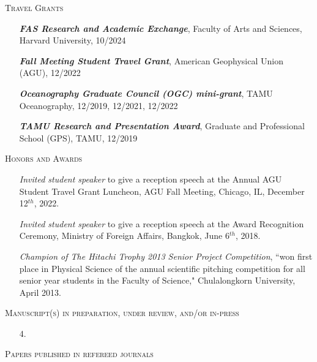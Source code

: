 \documentclass[10pt, letter]{article}
\newcommand{\margintext}[1]{\marginnote{\normalsize\textbf #1 |}}
\begin{document}
\textsc{Travel Grants}
\begin{itemize}[leftmargin=*]
    \item[] \emph{\textbf{FAS Research and Academic Exchange}}, Faculty of Arts and Sciences, Harvard University, 10/2024
    \item[] \emph{\textbf{Fall Meeting Student Travel Grant}}, American Geophysical Union (AGU), 12/2022
    \item[] \emph{\textbf{Oceanography Graduate Council (OGC) mini-grant}}, TAMU Oceanography, 12/2019, 12/2021, 12/2022 
    \item[] \emph{\textbf{TAMU Research and Presentation Award}}, Graduate and Professional School (GPS), TAMU, 12/2019
\end{itemize} 
\bigskip
\textsc{Honors and Awards}
\begin{itemize}[leftmargin=*]
    \item[] \emph{Invited student speaker} to give a reception speech at the Annual AGU Student Travel Grant Luncheon, AGU Fall Meeting, Chicago, IL, December 12$^{th}$, 2022.
    \item[] \emph{Invited student speaker} to give a reception speech at the Award Recognition Ceremony, Ministry of Foreign Affairs, Bangkok, June 6$^{th}$, 2018.
    \item[] \emph{Champion of The Hitachi Trophy 2013 Senior Project Competition}, ``won first place in Physical Science of the annual scientific pitching competition for all senior year students in the Faculty of Science," Chulalongkorn University, April 2013.
\end{itemize}

\bigskip
\margintext{Publications} \textsc{Manuscript(s) in preparation, under review, and/or in-press}
\begin{enumerate}
\item[4.] 
\end{enumerate}

\bigskip
\textsc{Papers published in refereed journals}
\begin{etaremune}
\item {}
\item {}
\item {}
\end{etaremune}
\end{document}
